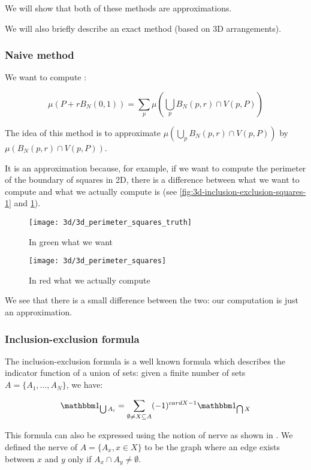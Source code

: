We will show that both of these methods are approximations.

We will also briefly describe an exact method (based on 3D arrangements).

\subsubsection{Naive method}

We want to compute :

$$ \mu(P + r B_N(0, 1)) = \sum_p \mu(\bigcup_p B_N(p, r) \cap V(p, P)) $$

The idea of this method is to approximate $ \mu(\bigcup_p B_N(p, r) \cap V(p,
P)) $ by $ \mu(B_N(p, r) \cap V(p, P)) $.

It is an approximation because, for example, if we want to compute the perimeter
of the boundary of squares in 2D, there is a difference between what we want to compute
and what we actually compute is (see \ref{fig:3d-inclusion-exclusion-squares-1}
and \ref{fig:3d-inclusion-exclusion-squares-2}).

\begin{figure}[h]
    \centering

    \texttt{[image: 3d/3d\_perimeter\_squares\_truth]}
    \caption{In green what we want}
    \label{fig:3d-inclusion-exclusion-squares-1}

    \texttt{[image: 3d/3d\_perimeter\_squares]}
    \caption{In red what we actually compute}
    \label{fig:3d-inclusion-exclusion-squares-2}
\end{figure}

We see that there is a small difference between the two: our computation is just
an approximation.


\subsubsection{Inclusion-exclusion formula}

The inclusion-exclusion formula is a well known formula which describes the
indicator function of a union of sets: given a finite number of sets $ A = \{
A_1, \ldots, A_N \} $, we have:

$$ \indicator{\bigcup A_i} = \sum_{\emptyset \neq X \subseteq A} (-1)^{card X -
    1} \indicator{\bigcap X} $$

This formula can also be expressed using the notion of nerve as shown in
\cite{attali2007inclusion}. We defined the nerve of $ A = \{ A_x, x \in X \} $
to be the graph where an edge exists between $ x $ and $ y $ only if $ A_x \cap
A_y \neq \emptyset $.

